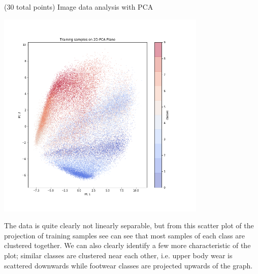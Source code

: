 \documentclass[12pt]{article}
\begin{document}
\begin{question}{(30 total points) Image data analysis with PCA}
\begin{subquestion}
   

      \begin{answerbox}{40em}
         \begin{center}
             \includegraphics[width=0.75\textwidth]{results/1_8.png}
         \end{center}
         The data is quite clearly not linearly separable, but from this scatter plot of the projection of training samples see can see that most samples of each class are clustered together. We can also clearly identify a few more characteristic of the plot; similar classes are clustered near each other, i.e. upper body wear is scattered downwards while footwear classes are projected upwards of the graph.
      \end{answerbox}
  


   \end{subquestion}
   

\end{question}
\clearpage
%
%
\end{document}
